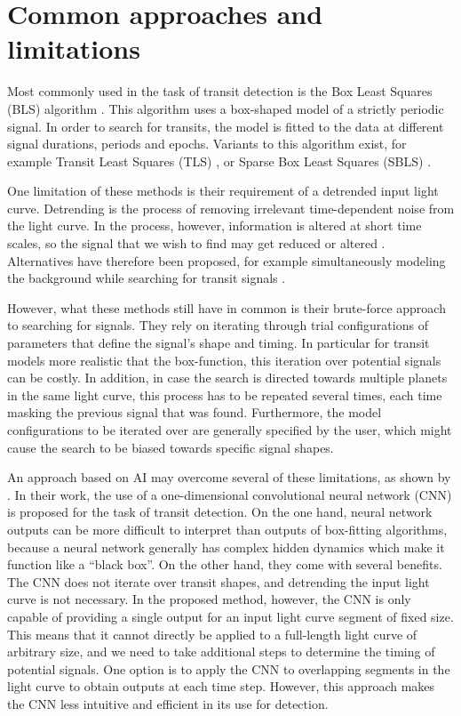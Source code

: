 
\section{Common approaches and limitations}
\label{sec:approaches}

Most commonly used in the task of transit detection is the Box Least Squares (BLS) algorithm \citep{kovacs2002box}. This algorithm uses a box-shaped model of a strictly periodic signal. In order to search for transits, the model is fitted to the data at different signal durations, periods and epochs. Variants to this algorithm exist, for example Transit Least Squares (TLS) \citep{hippke2019optimized}, or Sparse Box Least Squares (SBLS) \citep{panahi2021sparse}.

One limitation of these methods is their requirement of a detrended input light curve. Detrending is the process of removing irrelevant time-dependent noise from the light curve. In the process, however, information is altered at short time scales, so the signal that we wish to find may get reduced or altered \citep{hippke2019wotan}.  Alternatives have therefore been proposed, for example simultaneously modeling the background while searching for transit signals \cite{foreman2015systematic}.

However, what these methods still have in common is their brute-force approach to searching for signals. They rely on iterating through trial configurations of parameters that define the signal's shape and timing. In particular for transit models more realistic that the box-function, this iteration over potential signals can be costly. In addition, in case the search is directed towards multiple planets in the same light curve, this process has to be repeated several times, each time masking the previous signal that was found. Furthermore, the model configurations to be iterated over are generally specified by the user, which might cause the search to be biased towards specific signal shapes.

An approach based on AI may overcome several of these limitations, as shown by \cite{pearson2018searching}. In their work, the use of a one-dimensional convolutional neural network (CNN) is proposed for the task of transit detection. On the one hand, neural network outputs can be more difficult to interpret than outputs of box-fitting algorithms, because a neural network generally has complex hidden dynamics which make it function like a ``black box''. On the other hand, they come with several benefits. The CNN does not iterate over transit shapes, and detrending the input light curve is not necessary. In the proposed method, however, the CNN is only capable of providing a single output for an input light curve segment of fixed size. This means that it cannot directly be applied to a full-length light curve of arbitrary size, and we need to take additional steps to determine the timing of potential signals. One option is to apply the CNN to overlapping segments in the light curve to obtain outputs at each time step. However, this approach makes the CNN less intuitive and efficient in its use for detection. 

